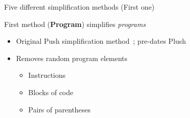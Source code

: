 \documentclass{beamer}
\begin{document}
\begin{frame}{Five different simplification methods (First one)}

First method (\textbf{Program}) simplifies \emph{programs}
\begin{itemize}
	\item Original Push simplification method~\cite{Spector:2014:GECCOcomp}; pre-dates Plush
	\item Removes random program elements
	\begin{itemize}
		\item Instructions
		\item Blocks of code
		\item Pairs of parentheses
	\end{itemize}
\end{itemize}


\end{frame}
\end{document}
